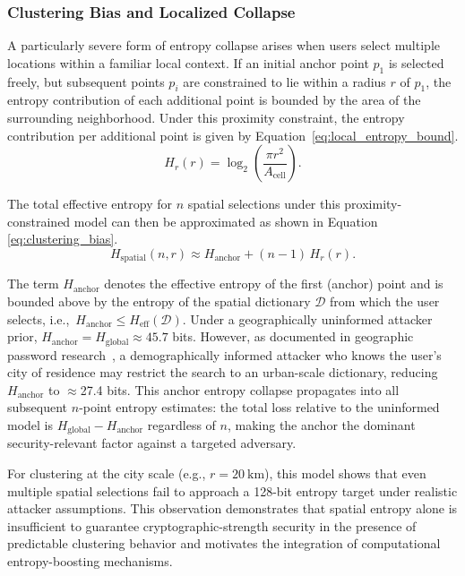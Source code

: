 \documentclass[mathematics,article,accept,pdftex,moreauthors]{Definitions/mdpi}
\begin{document}
\subsubsection{Clustering Bias and Localized Collapse}
\label{sec:clustering}

A particularly severe form of entropy collapse arises when users select multiple locations within a familiar local context. If an initial anchor point $p_1$ is selected freely, but subsequent points $p_i$ are constrained to lie within a radius $r$ of $p_1$, the entropy contribution of each additional point is bounded by the area of the surrounding neighborhood. Under this proximity constraint, the entropy contribution per additional point is given by \mbox{Equation \eqref{eq:local_entropy_bound}}.
\begin{equation}
H_r(r) = \log_2\!\left(\frac{\pi r^2}{A_{\text{cell}}}\right).
\label{eq:local_entropy_bound}
\end{equation}

The total effective entropy for $n$ spatial selections under this proximity-constrained model can then be approximated as shown in Equation \eqref{eq:clustering_bias}.
\begin{equation}
H_{\text{spatial}}(n,r) \approx H_{\text{anchor}} + (n-1)\,H_r(r).
\label{eq:clustering_bias}
\end{equation}

{The term $H_{\text{anchor}}$ denotes the effective entropy of the first (anchor) point and is bounded above by the entropy of the spatial dictionary $\mathcal{D}$ from which the user selects, i.e.,\ $H_{\text{anchor}} \le H_{\text{eff}}(\mathcal{D})$. Under a geographically uninformed attacker prior, $H_{\text{anchor}} = H_{\text{global}} \approx 45.7$ bits. However, as documented in geographic password research~\cite{Sun2012, Thorpe2013, AlAmeen2014}, a demographically informed attacker who knows the user's city of residence may restrict the search to an urban-scale dictionary, reducing $H_{\text{anchor}}$ to $\approx$27.4 bits. This anchor entropy collapse propagates into all subsequent $n$-point entropy estimates: the total loss relative to the uninformed model is $H_{\text{global}} - H_{\text{anchor}}$ regardless of $n$, making the anchor the dominant security-relevant factor against a targeted adversary.}

For clustering at the city scale (e.g., $r = 20~\text{km}$), this model shows that even multiple spatial selections fail to approach a 128-bit entropy target under realistic attacker assumptions. This observation demonstrates that spatial entropy alone is insufficient to guarantee cryptographic-strength security in the presence of predictable clustering behavior and motivates the integration of computational entropy-boosting mechanisms.
\end{document}
